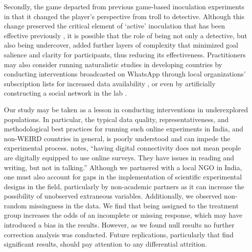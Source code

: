 \documentclass[empirical, authordate]{jote-new-article}
\begin{document}
Secondly, the game departed from previous game-based inoculation experiments in that it changed the player's perspective from troll to detective. Although this change preserved the critical element of ‘active' inoculation that has been effective previously \parencite{Pfau2005,Roozenbeek2019}, it is possible that the role of being not only a detective, but also being undercover, added further layers of complexity that minimized goal salience and clarity for participants, thus reducing its effectiveness. Practitioners may also consider running naturalistic studies in developing countries by conducting interventions broadcasted on \mbox{WhatsApp} through local organizations' subscription lists for increased data availability \parencite{Bowles2020}, or even by artificially constructing a social network in the lab \parencite{Pogorelskiy2017}.

Our study may be taken as a lesson in conducting interventions in underexplored populations. In particular, the typical data quality, representativeness, and methodological best practices for running such online experiments in India, and non-WEIRD countries in general, is poorly understood and can impede the experimental process. \textcite{Campbell-Smith2019} notes, “having digital connectivity does not mean people are digitally equipped to use online surveys. They have issues in reading and writing, but not in talking.” Although we partnered with a local NGO in India, one must also account for gaps in the implementation of scientific experimental designs in the field, particularly by non-academic partners as it can increase the possibility of unobserved extraneous variables. Additionally, we observed non-random missingness in the data. We find that being assigned to the treatment group increases the odds of an incomplete or missing response, which may have introduced a bias in the results. However, as we found null results no further correction analysis was conducted. Future replications, particularly that find significant results, should pay attention to any differential attrition.
\end{document}
